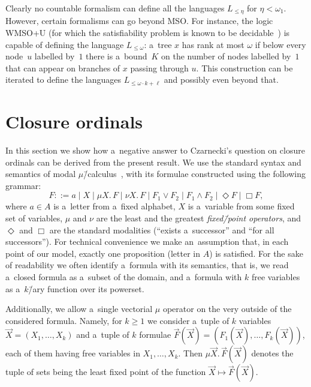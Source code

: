 \begin{rem}\label{rem:wmsou}
	Clearly no countable formalism can define all the languages $L_{\leq\eta}$ for $\eta<\omega_1$.
	However, certain formalisms can go beyond MSO.
	For instance, the logic WMSO+U (for which the satisfiability problem is known to be decidable~\cite{bojanczyk_wmso_u_p}) is capable of defining the language $L_{\leq \omega}$:
	a~tree $x$ has rank at most $\omega$ if below every node~$u$ labelled by~$1$ there is a~bound~$K$ on the number of nodes labelled by~$1$ that can appear on branches of $x$ passing through $u$.
	This construction can be iterated to define the languages $L_{\leq \omega\cdot k+\ell}$ and possibly even beyond that.
\end{rem}



\section{Closure ordinals}
\label{sec:closure_ordinals}

In this section we show how a~negative answer to Czarnecki's question on closure ordinals can be derived from the present result.
We use the standard syntax and semantics of modal $\mu$\=/calculus~\cite{kozen-mu-calc,niwinski_rudiments,Demri2016,julian-igor-handook}, with its formulae constructed using the following grammar:
\[F ::= a \mid X \mid \mu X.\, F \mid \nu X.\, F \mid F_1\lor F_2 \mid F_1\land F_2 \mid \Diamond F \mid \Box F,\]
where $a\in A$ is a~letter from a~fixed alphabet, $X$ is a~variable from some fixed set of variables,
$\mu$ and $\nu$ are the least and the greatest \emph{fixed\=/point operators}, and $\Diamond$ and $\Box$ are the standard modalities (``exists a~successor'' and ``for all successors'').
For technical convenience we make an~assumption that, in each point of our model, exactly one proposition (letter in $A$) is satisfied.
For the sake of readability we often identify a~formula with its semantics, that is, we read a~closed formula as a~subset of the domain,
and a~formula with $k$ free variables as a~$k$\=/ary function over its powerset.

Additionally, we allow a~single vectorial $\mu$ operator on the very outside of the considered formula.
Namely, for $k\geq 1$ we consider a~tuple of $k$ variables $\vec{X}=(X_1,\dots,X_k)$ and a~tuple of $k$ formulae $\vec{F}(\vec{X})=(F_1(\vec{X}),\dots,F_k(\vec{X}))$,
each of them having free variables in $X_1,\dots,X_k$.
Then $\mu\vec{X}.\,\vec{F}(\vec{X})$ denotes the tuple of sets being the least fixed point of the function $\vec{X}\mapsto\vec{F}(\vec{X})$.

